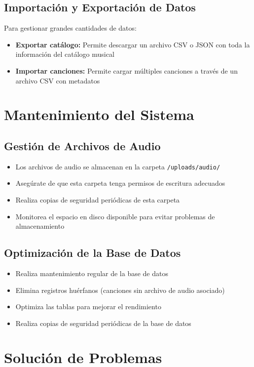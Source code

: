 \documentclass[a4paper,12pt]{article}
\begin{document}
\subsection{Importación y Exportación de Datos}
Para gestionar grandes cantidades de datos:
\begin{itemize}
  \item \textbf{Exportar catálogo:} Permite descargar un archivo CSV o JSON con toda la información del catálogo musical
  \item \textbf{Importar canciones:} Permite cargar múltiples canciones a través de un archivo CSV con metadatos
\end{itemize}

\section{Mantenimiento del Sistema}
\subsection{Gestión de Archivos de Audio}
\begin{itemize}
  \item Los archivos de audio se almacenan en la carpeta \texttt{/uploads/audio/}
  \item Asegúrate de que esta carpeta tenga permisos de escritura adecuados
  \item Realiza copias de seguridad periódicas de esta carpeta
  \item Monitorea el espacio en disco disponible para evitar problemas de almacenamiento
\end{itemize}

\subsection{Optimización de la Base de Datos}
\begin{itemize}
  \item Realiza mantenimiento regular de la base de datos
  \item Elimina registros huérfanos (canciones sin archivo de audio asociado)
  \item Optimiza las tablas para mejorar el rendimiento
  \item Realiza copias de seguridad periódicas de la base de datos
\end{itemize}

\section{Solución de Problemas}
\end{document}

